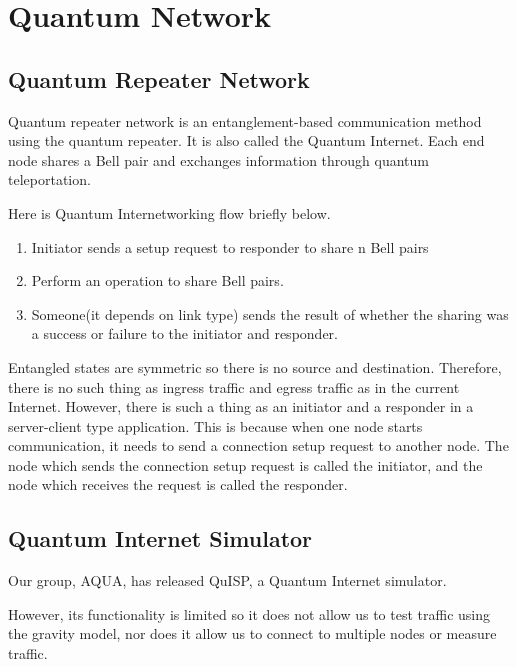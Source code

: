 \section{Quantum Network}
\subsection{Quantum Repeater Network}
Quantum repeater network is an entanglement-based communication method using the quantum repeater.
It is also called the Quantum Internet.
Each end node shares a Bell pair and exchanges information through quantum teleportation.

\begin{screen}
Here is Quantum Internetworking flow briefly below.
    \begin{enumerate}
        \item Initiator sends a setup request to responder to share n Bell pairs
        \item Perform an operation to share Bell pairs.
        \item Someone(it depends on link type) sends the result of whether the sharing was a success or failure to the initiator and responder.
    \end{enumerate}
\end{screen}

Entangled states are symmetric so there is no source and destination.
Therefore, there is no such thing as ingress traffic and egress traffic as in the current Internet.
However, there is such a thing as an initiator and a responder in a server-client type application.
This is because when one node starts communication, it needs to send a connection setup request to another node.
The node which sends the connection setup request is called the initiator, and the node which receives the request is called the responder.

\subsection{Quantum Internet Simulator}
Our group, AQUA, has released QuISP, a Quantum Internet simulator. \cite{satoh2021quisp}

However, its functionality is limited so it does not allow us to test traffic using the gravity model, nor does it allow us to connect to multiple nodes or measure traffic.

